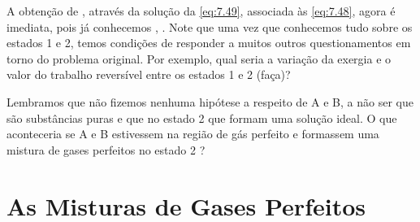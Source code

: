     A obtenção de , através da solução da
    \cref{eq:7.49}, associada às \cref{eq:7.48}, agora é imediata, pois já
    conhecemos , . Note
    que uma vez que conhecemos tudo sobre os estados 1 e 2, temos condições de
    responder a muitos outros questionamentos em torno do problema original.
    Por exemplo, qual seria a variação da exergia e o valor do  trabalho
    reversível entre os estados 1 e 2 (faça)?

    Lembramos que não fizemos nenhuma hipótese a respeito de A e B, a não ser
    que são substâncias puras e que no estado 2 que formam uma solução ideal. O
    que aconteceria se A e B estivessem na região de gás perfeito e formassem
    uma mistura de gases perfeitos no estado 2 ?


    \section{As Misturas de Gases Perfeitos}

